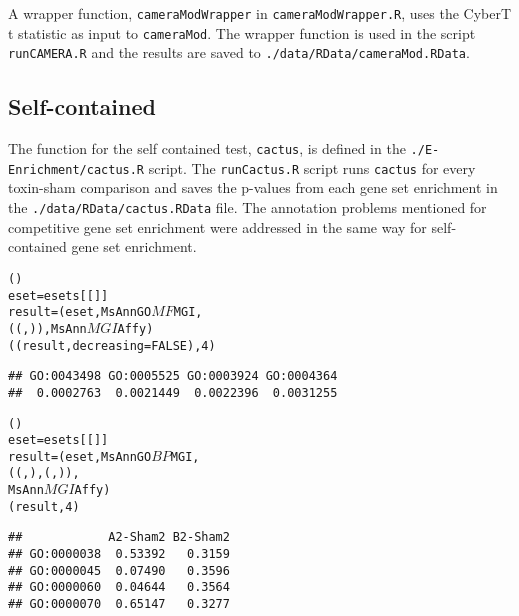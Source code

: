 A wrapper function, \texttt{cameraModWrapper} in \texttt{cameraModWrapper.R}, 
uses the CyberT t statistic as input to \texttt{cameraMod}. The wrapper function
is used in the script \texttt{runCAMERA.R} and the results are saved to
\texttt{./data/RData/cameraMod.RData}.

\subsection{Self-contained}

The function for the self contained test, \texttt{cactus}, is defined in the
\texttt{./E-Enrichment/cactus.R} script. The \texttt{runCactus.R} script
runs \texttt{cactus} for every toxin-sham comparison and saves the p-values
from each gene set enrichment in the \texttt{./data/RData/cactus.RData} file.
The annotation problems mentioned for competitive gene set enrichment
were addressed in the same way for self-contained gene set enrichment.

\begin{knitrout}
\color{fgcolor}\begin{kframe}
\begin{alltt}
()
eset = esets[[]]
result = (eset, MsAnnGO$MF$MGI, 
    ((, )), MsAnn$MGI$Affy)
((result, decreasing = FALSE), 4)
\end{alltt}
\begin{verbatim}
## GO:0043498 GO:0005525 GO:0003924 GO:0004364
##  0.0002763  0.0021449  0.0022396  0.0031255
\end{verbatim}
\begin{alltt}

()
eset = esets[[]]
result = (eset, MsAnnGO$BP$MGI, 
    ((, ), (, )), 
    MsAnn$MGI$Affy)
(result, 4)
\end{alltt}
\begin{verbatim}
##            A2-Sham2 B2-Sham2
## GO:0000038  0.53392   0.3159
## GO:0000045  0.07490   0.3596
## GO:0000060  0.04644   0.3564
## GO:0000070  0.65147   0.3277
\end{verbatim}
\end{kframe}
\end{knitrout}

